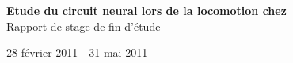 
\vspace*{\fill}
\begin{center}
   \textbf{ {\Huge Etude du circuit neural lors de la locomotion chez \caeleg{}}}\\[0.5em]{\huge Rapport de stage de fin d'étude}
\end{center}

\begin{center}
  28 février 2011 - 31 mai 2011
\end{center}

\vspace*{\fill}

\newpage
